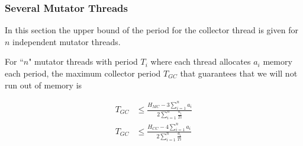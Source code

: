 \subsubsection{Several Mutator Threads}

In this section the upper bound of the period for the collector
thread is given for $n$ independent mutator threads.

\begin{theorem}
\label{sch:theorem}

For ``$n$" mutator threads with period $T_i$ where each thread
allocates $a_i$ memory each period, the maximum collector period
$T_{GC}$ that guarantees that we will not run out of memory is

\begin{align}\label{nth:mc:theorem}
    T_{GC} & \le \frac{H_{MC}-3\sum_{i=1}^{n} a_i}{2\sum_{i=1}^{n} \frac{a_i}{Ti}}\\
    \label{nth:cc:theorem}
    T_{GC} & \le \frac{H_{CC}-4\sum_{i=1}^{n} a_i}{2\sum_{i=1}^{n}
    \frac{a_i}{Ti}}
\end{align}

\end{theorem}

